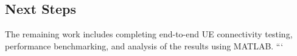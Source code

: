 \subsection{Next Steps}
The remaining work includes completing end-to-end UE connectivity testing,
performance benchmarking, and analysis of the results using MATLAB.
```